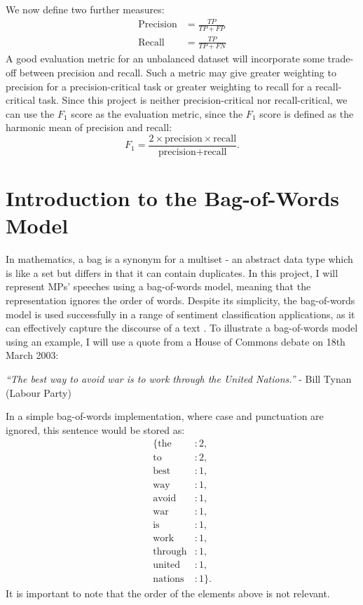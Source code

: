 \documentclass[12pt,a4paper,twoside,openright]{report}
\begin{document}
\newline
We now define two further measures:
\begin{align}
	\text{Precision} & = \frac{TP}{TP + FP} \\
	\text{Recall} & = \frac{TP}{TP + FN}
\end{align}
A good evaluation metric for an unbalanced dataset will incorporate some trade-off between precision and recall. Such a metric may give greater weighting to precision for a precision-critical task or greater weighting to recall for a recall-critical task. Since this project is neither precision-critical nor recall-critical, we can use the $F_1$ score as the evaluation metric, since the $F_1$ score is defined as the harmonic mean of precision and recall:
\begin{equation}
	F_1 = \frac{2 \times \text{precision} \times \text{recall}}{\text{precision} + \text{recall}}.
\end{equation}
\section{Introduction to the Bag-of-Words Model} \label{prep-bow}

In mathematics, a bag is a synonym for a multiset - an abstract data type which is like a set but differs in that it can contain duplicates. In this project, I will represent MPs' speeches using a bag-of-words model, meaning that the representation ignores the order of words. Despite its simplicity, the bag-of-words model is used successfully in a range of sentiment classification applications, as it can effectively capture the discourse of a text \cite{nlp_book}.
\newline
\newline
To illustrate a bag-of-words model using an example, I will use a quote from a House of Commons debate on 18th March 2003:
\begin{center}
	\textit{``The best way to avoid war is to work through the United Nations.''}
	\newline
	 - Bill Tynan (Labour Party)
\end{center}
In a simple bag-of-words implementation, where case and punctuation are ignored, this sentence would be stored as:
\begin{align*}
	\{\text{the}&: 2,\\ \text{to}&: 2,\\ \text{best}&: 1,\\ \text{way}&: 1,\\ \text{avoid}&: 1,\\ \text{war}&: 1,\\ \text{is}&: 1,\\ \text{work}&: 1,\\ \text{through}&: 1,\\ \text{united}&: 1,\\ \text{nations}&: 1\}.
\end{align*}
It is important to note that the order of the elements above is not relevant.
\end{document}
